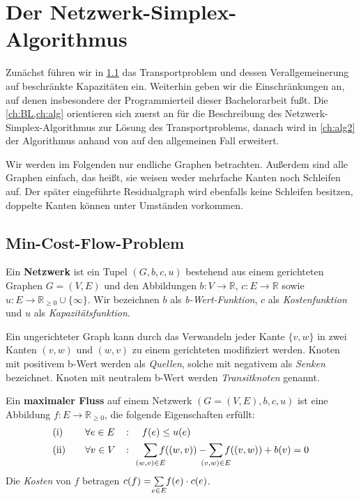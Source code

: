 \chapter{Der Netzwerk-Simplex-Algorithmus}\label{ch:NSA}
Zunächst führen wir in \cref{ch:MCF} das Transportproblem und dessen Verallgemeinerung auf beschränkte Kapazitäten ein. Weiterhin geben wir die Einschränkungen an, auf denen insbesondere der Programmierteil dieser Bachelorarbeit fußt. Die \cref{ch:BL,ch:alg} orientieren sich zuerst an \cite[S. 291\,ff.]{NSAbook} für die Beschreibung des Netzwerk-Simplex-Algorithmus zur Lösung des Transportproblems, danach wird in \cref{ch:alg2} der Algorithmus anhand von \cite[S. 353\,ff.]{NSAbook} auf den allgemeinen Fall erweitert.

Wir werden im Folgenden nur endliche Graphen betrachten. Außerdem sind alle Graphen einfach, das heißt, sie weisen weder mehrfache Kanten noch Schleifen auf. Der später eingeführte Residualgraph wird ebenfalls keine Schleifen besitzen, doppelte Kanten können unter Umständen vorkommen.

\section{Min-Cost-Flow-Problem}\label{ch:MCF}
\begin{defn}Ein \textbf{Netzwerk} ist ein Tupel $(G,b,c,u)$ bestehend aus einem gerichteten Graphen $G = (V,E)$ und den Abbildungen $b \colon V\rightarrow\mathbb{R}$, $c \colon E\rightarrow\mathbb{R}$ sowie $u \colon E\rightarrow\mathbb{R}_{\geq 0}\cup \{\infty\}$. Wir bezeichnen $b$ als \emph{b-Wert-Funktion}, $c$ als \emph{Kostenfunktion} und $u$ als \emph{Kapazitätsfunktion}.\end{defn}
\begin{anm}Ein ungerichteter Graph kann durch das Verwandeln jeder Kante $\{v,w\}$ in zwei Kanten $(v,w)$ und $(w,v)$ zu einem gerichteten modifiziert werden. Knoten mit positivem b-Wert werden als \emph{Quellen}, solche mit negativem als \emph{Senken} bezeichnet. Knoten mit neutralem b-Wert werden \emph{Transitknoten} genannt.\end{anm}

\begin{defn}\label{DefMaxFlow}Ein \textbf{maximaler Fluss} auf einem Netzwerk $(G=(V,E),b,c,u)$ ist eine Abbildung $f \colon E\rightarrow\mathbb{R}_{\geq 0}$, die folgende Eigenschaften erfüllt:
\begin{alignat}{3}
&\text{(i)}\quad&&\forall e\in E &&\colon\quad f(e)\leq u(e)\nonumber\\
&\text{(ii)}\quad&&\forall v\in V &&\colon\quad \sum_{\mathclap{(w,v)\in E}} f((w,v)) - \sum_{\mathclap{(v,w)\in E}} f((v,w)) + b(v) = 0\label{DefMaxFlowII}
\end{alignat}
Die \emph{Kosten} von $f$ betragen $c(f) = \sum\limits_{\mathclap{e\in E}} f(e)\cdot c(e)$.
\end{defn}

